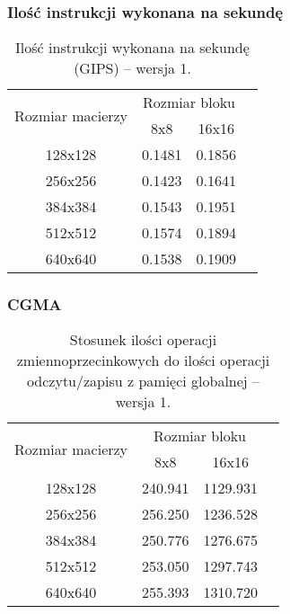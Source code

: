 \subsubsection{Ilość instrukcji wykonana na sekundę}

\begin{table}[H]
\centering
\begin{tabular}{|c|c|c|c|}
\hline
\multirow{2}{*}{Rozmiar macierzy} & \multicolumn{2}{c|}{Rozmiar bloku} \\ \cline{2-3}
& 8x8 & 16x16 \\ \hline
128x128 & 0.1481 & 0.1856 \\ \hline
256x256 & 0.1423 & 0.1641 \\ \hline
384x384 & 0.1543 & 0.1951 \\ \hline
512x512 & 0.1574 & 0.1894 \\ \hline
640x640 & 0.1538 & 0.1909 \\ \hline
\end{tabular}
\caption{Ilość instrukcji wykonana na sekundę (GIPS) -- wersja 1.}
\end{table}

\subsubsection{CGMA}

\begin{table}[H]
\centering
\begin{tabular}{|c|c|c|c|}
\hline
\multirow{2}{*}{Rozmiar macierzy} & \multicolumn{2}{c|}{Rozmiar bloku} \\ \cline{2-3}
& 8x8 & 16x16 \\ \hline
128x128 & 240.941 & 1129.931 \\ \hline
256x256 & 256.250 & 1236.528 \\ \hline
384x384 & 250.776 & 1276.675 \\ \hline
512x512 & 253.050 & 1297.743 \\ \hline
640x640 & 255.393 & 1310.720 \\ \hline
\end{tabular}
\caption{Stosunek ilości operacji zmiennoprzecinkowych do ilości operacji odczytu/zapisu z pamięci globalnej -- wersja 1.}
\end{table}

